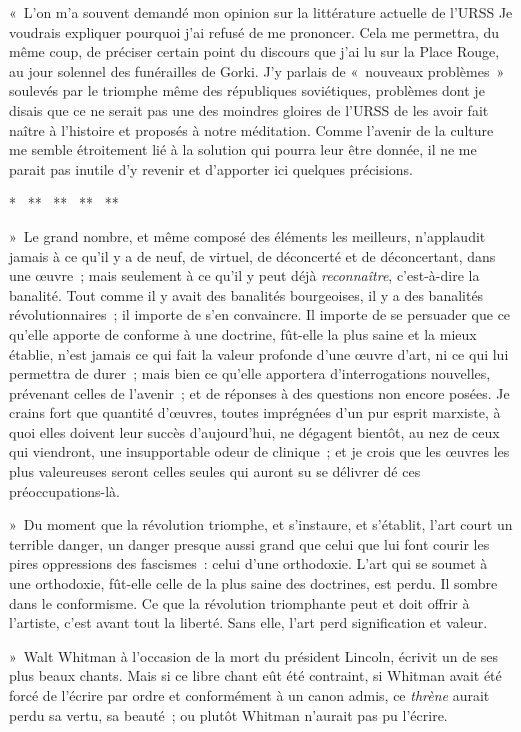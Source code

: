 \documentclass[french,twoside]{book} %
\begin{document}
« L’on m’a souvent demandé mon opinion sur la littérature actuelle de l’URSS Je voudrais expliquer pourquoi j’ai refusé de me prononcer. Cela me permettra, du même coup, de préciser certain point du discours que j’ai lu sur la Place Rouge, au jour solennel des funérailles de Gorki. J’y parlais de « nouveaux problèmes » soulevés par le triomphe même des républiques soviétiques, problèmes dont je disais que ce ne serait pas une des moindres gloires de l’URSS de les avoir fait naître à l’histoire et proposés à notre méditation. Comme l’avenir de la culture me semble étroitement lié à la solution qui pourra leur être donnée, il ne me parait pas inutile d’y revenir et d’apporter ici quelques précisions.\par
{\centering \noindent **  **  **  **  **\par}
\noindent » Le grand nombre, et même composé des éléments les meilleurs, n’applaudit jamais à ce qu’il y a de neuf, de virtuel, de déconcerté et de déconcertant, dans une œuvre ; mais seulement à ce qu’il y peut déjà \emph{reconnaître}, c’est-à-dire la banalité. Tout comme il y avait des banalités bourgeoises, il y a des banalités révolutionnaires ; il importe de s’en convaincre. Il importe de se persuader que ce qu’elle apporte de conforme à une doctrine, fût-elle la plus saine et la mieux établie, n’est jamais ce qui fait la valeur profonde d’une œuvre d’art, ni ce qui lui permettra de durer ; mais bien ce qu’elle apportera d’interrogations nouvelles, prévenant celles de l’avenir ; et de réponses à des questions non encore posées. Je crains fort que quantité d’œuvres, toutes imprégnées d’un pur esprit marxiste, à quoi elles doivent leur succès d’aujourd’hui, ne dégagent bientôt, au nez de ceux qui viendront, une insupportable odeur de clinique ; et je crois que les œuvres les plus valeureuses seront celles seules qui auront su se délivrer dé ces préoccupations-là.\par
» Du moment que la révolution triomphe, et s’instaure, et s’établit, l’art court un terrible danger, un danger presque aussi grand que celui que lui font courir les pires oppressions des fascismes : celui d’une orthodoxie. L’art qui se soumet à une orthodoxie, fût-elle celle de la plus saine des doctrines, est perdu. Il sombre dans le conformisme. Ce que la révolution triomphante peut et doit offrir à l’artiste, c’est avant tout la liberté. Sans elle, l’art perd signification et valeur.\par
» Walt Whitman à l’occasion de la mort du président Lincoln, écrivit un de ses plus beaux chants. Mais si ce libre chant eût été contraint, si Whitman avait été forcé de l’écrire par ordre et conformément à un canon admis, ce \emph{thrène} aurait perdu sa vertu, sa beauté ; ou plutôt Whitman n’aurait pas pu l’écrire.\par
\end{document}
